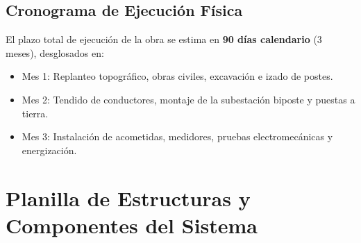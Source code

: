 \documentclass[12pt,a4paper]{report}
\begin{document}
\section{Cronograma de Ejecución Física}
El plazo total de ejecución de la obra se estima en \textbf{90 días calendario} (3 meses), desglosados en:
\begin{itemize}
    \item Mes 1: Replanteo topográfico, obras civiles, excavación e izado de postes.
    \item Mes 2: Tendido de conductores, montaje de la subestación biposte y puestas a tierra.
    \item Mes 3: Instalación de acometidas, medidores, pruebas electromecánicas y energización.
\end{itemize}

\chapter{Planilla de Estructuras y Componentes del Sistema}
\end{document}
